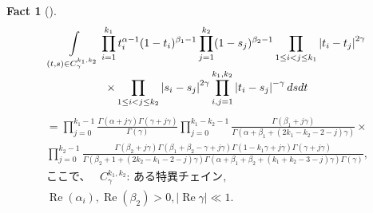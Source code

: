 \documentclass[12pt]{article} %
\newtheorem*{fact*}{Fact}
\theoremstyle{remark}
\newcommand{\mypgf}{{\mbox{ガンマ関数の積}}}
\newcommand{\tmop}[1]{\ensuremath{\operatorname{#1}}}
\begin{document}
			\begin{fact*}[{\cite[(3.4)]{tarasov2003selberg}}]
			{
		\begin{equation*}
			\begin{array}{c}
				\displaystyle\int_{(t,s)\in C_\gamma^{k_1,k_2}}
				\displaystyle\prod\displaylimits_{i=1}^{k_1}t_i^{\alpha-1}(1-t_i)^{\beta_1-1}
				\displaystyle\prod\displaylimits_{j=1}^{k_2}(1-s_j)^{\beta_2-1}
				\displaystyle\prod_{1\le i<j\le k_1}\myabs{t_i-t_j}^{2\gamma}\\
				\times\displaystyle\prod_{1\le i<j\le k_2}\myabs{s_i-s_j}^{2\gamma}
				\displaystyle\prod_{i,j=1}^{k_1,k_2}\myabs{t_i-s_j}^{-\gamma}dsdt
				      \end{array}\end{equation*}
			      \begin{equation*}
			\begin{array}{c}
  =\displaystyle\prod_{j = 0}^{k_1 - 1} \frac{\Gamma (\alpha + j \gamma) \Gamma (\gamma + j
  \gamma)}{\Gamma (\gamma)} \displaystyle\prod_{j = 0}^{k_1 - k_2 - 1} \frac{\Gamma
  (\beta_1 + j \gamma)}{\Gamma (\alpha + \beta_1 + (2 k_1 - k_2 - 2 - j)
  \gamma)} \times\\
  \displaystyle\prod_{j = 0}^{k_2 - 1} \frac{\Gamma (\beta_2 + j \gamma) \Gamma (\beta_1 +
  \beta_2 - \gamma + j \gamma) \Gamma (1 - k_1 \gamma + j \gamma) \Gamma
  (\gamma + j \gamma)}{\Gamma (\beta_2 + 1 + (2 k_2 - k_1 - 2 - j) \gamma)
  \Gamma (\alpha + \beta_1 + \beta_2 + (k_1 + k_2 - 3 - j) \gamma) \Gamma
  (\gamma)},\\
					  \mbox{ここで、　 }	C^{k_1,k_2}_{\gamma}\mbox{: ある特異チェイン},\\
					  \tmop{Re} (\alpha_i), \tmop{Re} (\beta_2) > 0, | \tmop{Re} \gamma | \ll 1.
			\end{array}
			\end{equation*}
				}
		\end{fact*}
\end{document}
